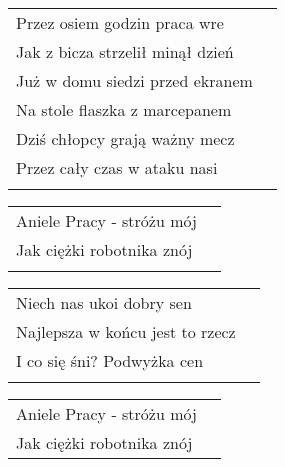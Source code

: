 \documentclass[a5paper]{article}
\begin{document}
\noindent
\begin{tabular}{@{}p{6.50cm}p{3cm}@{}}
Przez osiem godzin praca wre \\
Jak z bicza strzelił minął dzień \\
Już w domu siedzi przed ekranem \\
Na stole flaszka z marcepanem \\
Dziś chłopcy grają ważny mecz \\
Przez cały czas w ataku nasi \\ \\
\end{tabular}

\noindent
\begin{tabular}{@{}p{6.50cm}p{3cm}@{}}
Aniele Pracy - stróżu mój \\
Jak ciężki robotnika znój \\ \\
\end{tabular}

\noindent
\begin{tabular}{@{}p{6.50cm}p{3cm}@{}}
Niech nas ukoi dobry sen \\
Najlepsza w końcu jest to rzecz \\
I co się śni? Podwyżka cen \\ \\
\end{tabular}

\noindent
\begin{tabular}{@{}p{6.50cm}p{3cm}@{}}
Aniele Pracy - stróżu mój \\
Jak ciężki robotnika znój 
\end{tabular}
\end{document}
